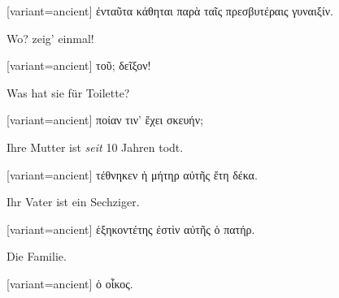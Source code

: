 \switchcolumn

\begin{greek}[variant=ancient]%
ἐνταῦτα κάθηται παρὰ ταῖς πρεσβυτέραις γυναιξίν.

\end{greek}%
\switchcolumn*

Wo? zeig' einmal! 

\switchcolumn

\begin{greek}[variant=ancient]%
τοῦ; δεῖξον!

\end{greek}%
\switchcolumn*

Was hat sie für Toilette? 

\switchcolumn

\begin{greek}[variant=ancient]%
ποίαν τιν' ἔχει σκευήν;

\end{greek}%
\switchcolumn*

Ihre Mutter ist \emph{seit} 10 Jahren todt.

\switchcolumn

\begin{greek}[variant=ancient]%
τέθνηκεν ἡ μήτηρ αὐτῆς ἔτη δέκα.

\end{greek}%
\switchcolumn*

Ihr Vater ist ein Sechziger. 

\switchcolumn

\begin{greek}[variant=ancient]%
ἑξηκοντέτης ἐστὶν αὐτῆς ὁ πατήρ.

\end{greek}%
\switchcolumn*

Die Familie. 

\switchcolumn

\begin{greek}[variant=ancient]%
ὁ οἶκος.

\end{greek}%
